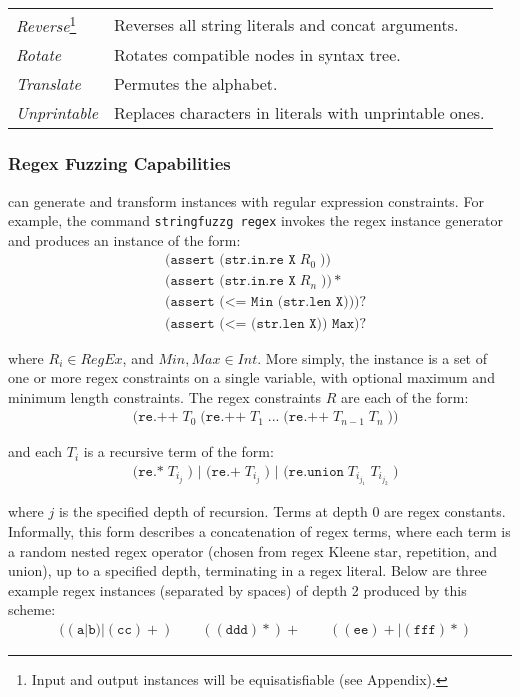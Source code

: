 \begin{table}[t]
\begin{subtable}{1\textwidth}
\begin{tabular}{l l}
            \textit{Reverse}\footnote{Input and output 
            instances will be equisatisfiable (see Appendix).}
            & Reverses all string literals and concat arguments.\\
            \textit{Rotate}
            & Rotates compatible nodes in syntax tree.\\
            \textit{Translate}\footnotemark[4]
            & Permutes the alphabet.\\
            \textit{Unprintable}
            & Replaces characters in literals with unprintable ones.\\
            \bottomrule
        \end{tabular}
    \end{subtable}
\end{table}

\subsubsection{Regex Fuzzing Capabilities}
\fuzzer{} can generate
and transform instances with regular expression constraints. For example, the
command \texttt{stringfuzzg regex} invokes the regex instance
generator and produces an instance of the form:
\begin{align*}
    & \texttt{(assert (str.in.re X}\; R_0\; \texttt{))} \\
    & \texttt{(assert (str.in.re X}\; R_n\; \texttt{))}* \\
    & \texttt{(assert (<= Min (str.len X)))}? \\
    & \texttt{(assert (<= (str.len X)) Max)}?
\end{align*}

where $R_i \in RegEx$, and $Min, Max \in Int$. More simply, the
instance is a set of one or more regex constraints on a single
variable, with optional maximum and minimum length constraints. The
regex constraints $R$ are each of the form:
\begin{align*}
    & \texttt{(re.++}\; T_0\; \texttt{(re.++}\; T_1\;
    \texttt{...}\; \texttt{(re.++}\; T_{n-1}\; T_n\; \texttt{))}
\end{align*}

and each $T_i$ is a recursive term of the form:
\begin{align*}
    & \texttt{(re.*}\; T_{i_j}\; \texttt{) | (re.+}\; T_{i_j}\;
    \texttt{) | (re.union}\; T_{i_{j_1}}\; T_{i_{j_2}}\; \texttt{)}
\end{align*}

where $j$ is the specified depth of recursion. Terms at depth 0 are
regex constants. Informally, this form describes a concatenation of
regex terms, where each term is a random nested regex operator (chosen from
regex Kleene star, repetition, and union), up to a specified depth,
terminating in a regex literal. Below are three example regex instances
(separated by spaces) of depth 2 produced by this scheme:
\begin{align*}
    & ((\texttt{a}|\texttt{b})|(\texttt{cc})+)\quad\quad
    ((\texttt{ddd})*)+\quad\quad ((\texttt{ee})+|(\texttt{fff})*)
\end{align*}

